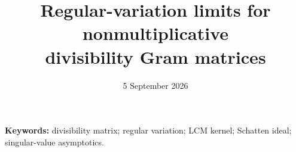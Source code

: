 \documentclass[11pt,a4paper]{article}
\title{Regular-variation limits for nonmultiplicative\\divisibility Gram matrices}
\author{}
\date{5 September 2026}
\begin{document}
\maketitle
\begin{abstract}

\end{abstract}
\noindent\textbf{Keywords:} divisibility matrix; regular variation; LCM kernel;
Schatten ideal; singular-value asymptotics.










\end{document}

